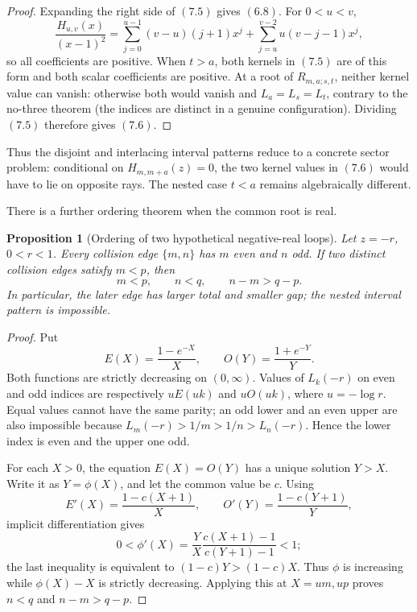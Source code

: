 \documentclass[11pt]{article}
\newtheorem{proposition}[theorem]{Proposition}
\theoremstyle{definition}
\begin{document}
\begin{proof}
Expanding the right side of \((7.5)\) gives \((6.8)\).  For \(0<u<v\),
\begin{equation}
 \frac{H_{u,v}(x)}{(x-1)^2}
 =\sum_{j=0}^{u-1}(v-u)(j+1)x^j
  +\sum_{j=u}^{v-2}u(v-j-1)x^j,
 \tag{7.7}
\end{equation}
so all coefficients are positive.  When \(t>a\), both kernels in
\((7.5)\) are of this form and both scalar coefficients are positive.
At a root of \(R_{m,a;s,t}\), neither kernel value can vanish:
otherwise both would vanish and \(L_a=L_s=L_t\), contrary to the
no-three theorem (the indices are distinct in a genuine configuration).
Dividing \((7.5)\) therefore gives \((7.6)\).
\end{proof}

Thus the disjoint and interlacing interval patterns reduce to a concrete
sector problem: conditional on \(H_{m,m+a}(z)=0\), the two kernel values in
\((7.6)\) would have to lie on opposite rays.  The nested case \(t<a\)
remains algebraically different.

There is a further ordering theorem when the common root is real.

\begin{proposition}[Ordering of two hypothetical negative-real loops]
\label{prop:negativeorder}
Let \(z=-r\), \(0<r<1\).  Every collision edge \(\{m,n\}\) has
\(m\) even and \(n\) odd.  If two distinct collision edges satisfy
\(m<p\), then
\begin{equation}
 m<p,\qquad n<q,\qquad n-m>q-p.
 \tag{7.8}
\end{equation}
In particular, the later edge has larger total and smaller gap; the nested
interval pattern is impossible.
\end{proposition}

\begin{proof}
Put
\[
 E(X)=\frac{1-e^{-X}}{X},\qquad
 O(Y)=\frac{1+e^{-Y}}{Y}.
\]
Both functions are strictly decreasing on \((0,\infty)\).  Values of
\(L_k(-r)\) on even and odd indices are respectively
\(uE(uk)\) and \(uO(uk)\), where \(u=-\log r\).  Equal values cannot have
the same parity; an odd lower and an even upper are also impossible because
\(L_m(-r)>1/m>1/n>L_n(-r)\).  Hence the lower index is even and the upper
one odd.

For each \(X>0\), the equation \(E(X)=O(Y)\) has a unique solution
\(Y>X\).  Write it as \(Y=\phi(X)\), and let the common value be \(c\).
Using
\[
 E'(X)=\frac{1-c(X+1)}{X},\qquad
 O'(Y)=\frac{1-c(Y+1)}{Y},
\]
implicit differentiation gives
\[
 0<\phi'(X)
 =\frac{Y}{X}\frac{c(X+1)-1}{c(Y+1)-1}<1;
\]
the last inequality is equivalent to
\((1-c)Y>(1-c)X\).  Thus \(\phi\) is increasing while
\(\phi(X)-X\) is strictly decreasing.  Applying this at
\(X=um,up\) proves \(n<q\) and \(n-m>q-p\).
\end{proof}
\end{document}
